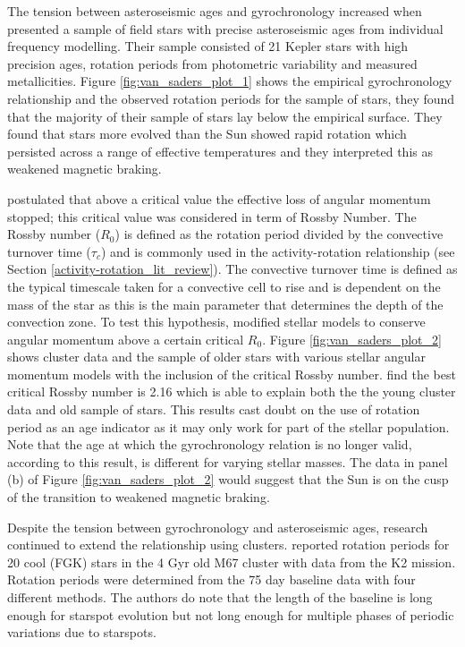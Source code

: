 The tension between asteroseismic ages and gyrochronology increased when \citet{van_Saders_etal_2016} presented a sample of field stars with precise asteroseismic ages from individual frequency modelling. Their sample consisted of 21 Kepler stars with high precision ages, rotation periods from photometric variability and measured metallicities. Figure \ref{fig:van_saders_plot_1} shows the empirical gyrochronology relationship and the observed rotation periods for the \citet{van_Saders_etal_2016} sample of stars, they found that the majority of their sample of stars lay below the empirical surface. They found that stars more evolved than the Sun showed rapid rotation which persisted across a range of effective temperatures and they interpreted this as weakened magnetic braking.

\citet{van_Saders_etal_2016} postulated that above a critical value the effective loss of angular momentum stopped; this critical value was considered in term of Rossby Number. The Rossby number ($R_{0}$) is defined as the rotation period divided by the convective turnover time ($\tau_{c}$) and is commonly used in the activity-rotation relationship (see Section \ref{activity-rotation_lit_review}). The convective turnover time is defined as the typical timescale taken for a convective cell to rise and is dependent on the mass of the star as this is the main parameter that determines the depth of the convection zone. To test this hypothesis, \citet{van_Saders_etal_2016} modified stellar models to conserve angular momentum above a certain critical $R_{0}$. Figure \ref{fig:van_saders_plot_2} shows cluster data and the sample of older stars with various stellar angular momentum models with the inclusion of the critical Rossby number. \citet{van_Saders_etal_2016} find the best critical Rossby number is 2.16 which is able to explain both the the young cluster data and old sample of stars. This results cast doubt on the use of rotation period as an age indicator as it may only work for part of the stellar population. Note that the age at which the gyrochronology relation is no longer valid, according to this result, is different for varying stellar masses. The data in panel (b) of Figure \ref{fig:van_saders_plot_2} would suggest that the Sun is on the cusp of the transition to weakened magnetic braking.

Despite the tension between gyrochronology and asteroseismic ages, research continued to extend the relationship using clusters. \citet{Barnes_etal_2016} reported rotation periods for 20 cool (FGK) stars in the 4 Gyr old M67 cluster with data from the K2 mission. Rotation periods were determined from the 75 day baseline data with four different methods. The authors do note that the length of the baseline is long enough for starspot evolution but not long enough for multiple phases of periodic variations due to starspots.

